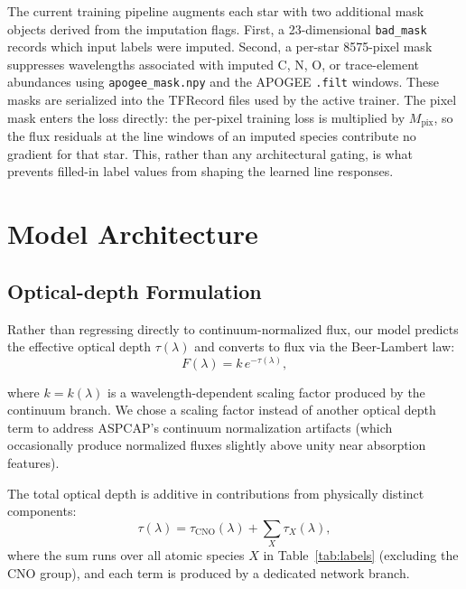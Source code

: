 \documentclass[preprint]{aastex701-1/aastex701}
\begin{document}
The current training pipeline augments each star with two additional mask objects derived
from the imputation flags. First, a 23-dimensional \texttt{bad\_mask} records which input
labels were imputed. Second, a per-star 8575-pixel mask suppresses wavelengths associated
with imputed C, N, O, or trace-element abundances using \texttt{apogee\_mask.npy} and the
APOGEE \texttt{.filt} windows. These masks are serialized into the TFRecord files used by
the active trainer. The pixel mask enters the loss directly: the per-pixel training loss is
multiplied by $M_\mathrm{pix}$, so the flux residuals at the line windows of an imputed
species contribute no gradient for that star. This, rather than any architectural gating,
is what prevents filled-in label values from shaping the learned line responses.

\section{Model Architecture}
\label{sec:model}

\subsection{Optical-depth Formulation}
\label{subsec:tau}

Rather than regressing directly to continuum-normalized flux, our model predicts the
effective optical depth $\tau(\lambda)$ and converts to flux via the Beer-Lambert law:
\begin{equation}
F(\lambda) = k \, e^{-\tau(\lambda)},
\label{eq:beer}
\end{equation}

where $k = k(\lambda)$ is a wavelength-dependent scaling factor produced by the continuum branch. We chose a scaling factor instead of another optical depth term to address ASPCAP's continuum normalization artifacts (which occasionally produce normalized fluxes slightly above unity near absorption features).

The total optical depth is additive in contributions from
physically distinct components:
\begin{equation}
\tau(\lambda) =  \tau_\mathrm{CNO}(\lambda)
               + \sum_X \tau_X(\lambda),
\label{eq:tau_sum}
\end{equation}
where the sum runs over all atomic species $X$ in Table~\ref{tab:labels} (excluding the
CNO group), and each term is produced by a dedicated network branch.
\end{document}
